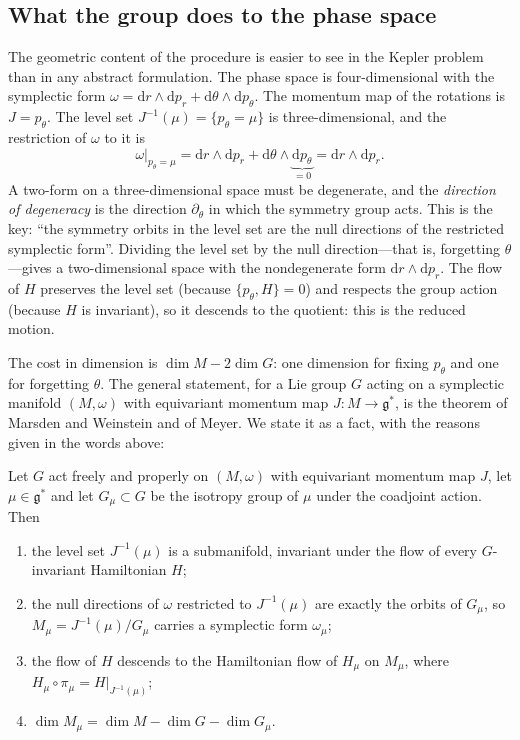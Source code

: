 \subsection{What the group does to the phase space}\label{rd:sec:fact}

The geometric content of the procedure is easier to see in the Kepler problem than in any abstract formulation. The phase space is four-dimensional with the symplectic form $\omega=\mathrm dr\wedge\mathrm dp_r+\mathrm d\theta\wedge\mathrm dp_\theta$. The momentum map of the rotations is $J=p_\theta$. The level set $J^{-1}(\mu)=\{p_\theta=\mu\}$ is three-dimensional, and the restriction of $\omega$ to it is
\begin{equation}\label{rd:omegarestr}
\omega\big|_{p_\theta=\mu}=\mathrm dr\wedge\mathrm dp_r+\mathrm d\theta\wedge\underbrace{\mathrm dp_\theta}_{=0}=\mathrm dr\wedge\mathrm dp_r .
\end{equation}
A two-form on a three-dimensional space must be degenerate, and the \emph{direction of degeneracy} is the direction $\partial_\theta$ in which the symmetry group acts. This is the key: ``the symmetry orbits in the level set are the null directions of the restricted symplectic form''. Dividing the level set by the null direction---that is, forgetting $\theta$---gives a two-dimensional space with the nondegenerate form $\mathrm dr\wedge\mathrm dp_r$. The flow of $H$ preserves the level set (because $\{p_\theta,H\}=0$) and respects the group action (because $H$ is invariant), so it descends to the quotient: this is the reduced motion.

The cost in dimension is $\dim M-2\dim G$: one dimension for fixing $p_\theta$ and one for forgetting $\theta$. The general statement, for a Lie group $G$ acting on a symplectic manifold $(M,\omega)$ with equivariant momentum map $J:M\to\mathfrak g^*$, is the theorem of Marsden and Weinstein and of Meyer. We state it as a fact, with the reasons given in the words above:

\begin{rdfact}\label{rd:fact:MWM}
Let $G$ act freely and properly on $(M,\omega)$ with equivariant momentum map $J$, let $\mu\in\mathfrak g^*$ and let $G_\mu\subset G$ be the isotropy group of $\mu$ under the coadjoint action. Then
\begin{enumerate}[label=(\roman*)]
\item the level set $J^{-1}(\mu)$ is a submanifold, invariant under the flow of every $G$-invariant Hamiltonian $H$;
\item the null directions of $\omega$ restricted to $J^{-1}(\mu)$ are exactly the orbits of $G_\mu$, so $M_\mu=J^{-1}(\mu)/G_\mu$ carries a symplectic form $\omega_\mu$;
\item the flow of $H$ descends to the Hamiltonian flow of $H_\mu$ on $M_\mu$, where $H_\mu\circ\pi_\mu=H|_{J^{-1}(\mu)}$;
\item $\dim M_\mu=\dim M-\dim G-\dim G_\mu$.
\end{enumerate}
\end{rdfact}

